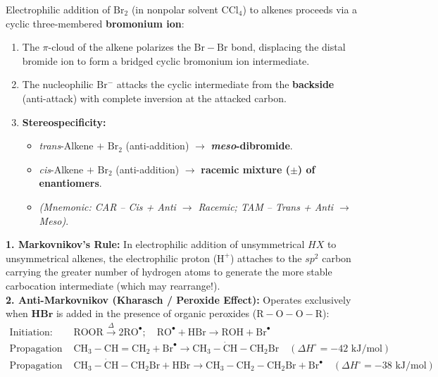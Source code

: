\documentclass[10pt,a4paper]{article}
\begin{document}
\begin{conceptbox}
Electrophilic addition of $\mathrm{Br_2}$ (in nonpolar solvent $\mathrm{CCl_4}$) to alkenes proceeds via a cyclic three-membered \textbf{bromonium ion}:
\begin{enumerate}[leftmargin=*]
  \item The $\pi$-cloud of the alkene polarizes the $\mathrm{Br-Br}$ bond, displacing the distal bromide ion to form a bridged cyclic bromonium ion intermediate.
  \item The nucleophilic $\mathrm{Br^-}$ attacks the cyclic intermediate from the \textbf{backside} (anti-attack) with complete inversion at the attacked carbon.
  \item \textbf{Stereospecificity:}
  \begin{itemize}
    \item \textit{trans}-Alkene $+$ $\mathrm{Br_2}$ (anti-addition) $\longrightarrow$ \textbf{\textit{meso}-dibromide}.
    \item \textit{cis}-Alkene $+$ $\mathrm{Br_2}$ (anti-addition) $\longrightarrow$ \textbf{racemic mixture ($\pm$) of enantiomers}.
    \item \textit{(Mnemonic: CAR -- Cis + Anti $\to$ Racemic; TAM -- Trans + Anti $\to$ Meso)}.
  \end{itemize}
\end{enumerate}
\end{conceptbox}

\begin{formulabox}
\textbf{1. Markovnikov's Rule:} In electrophilic addition of unsymmetrical $HX$ to unsymmetrical alkenes, the electrophilic proton ($\mathrm{H^+}$) attaches to the $sp^2$ carbon carrying the greater number of hydrogen atoms to generate the more stable carbocation intermediate (which may rearrange!).\\
\textbf{2. Anti-Markovnikov (Kharasch / Peroxide Effect):}
Operates exclusively when $\mathbf{HBr}$ is added in the presence of organic peroxides ($\mathrm{R-O-O-R}$):
\begin{align}
  \text{Initiation: } & \mathrm{ROOR} \xrightarrow{\Delta} 2\mathrm{RO}^\bullet; \quad \mathrm{RO}^\bullet + \mathrm{HBr} \to \mathrm{ROH} + \mathrm{Br}^\bullet\\
  \text{Propagation 1: } & \mathrm{CH_3-CH=CH_2} + \mathrm{Br}^\bullet \to \mathrm{CH_3-\dot{C}H-CH_2Br} \quad (\Delta H^\circ = -42\text{ kJ/mol})\\
  \text{Propagation 2: } & \mathrm{CH_3-\dot{C}H-CH_2Br} + \mathrm{HBr} \to \mathrm{CH_3-CH_2-CH_2Br} + \mathrm{Br}^\bullet \quad (\Delta H^\circ = -38\text{ kJ/mol})
\end{align}
\end{formulabox}
\end{document}
